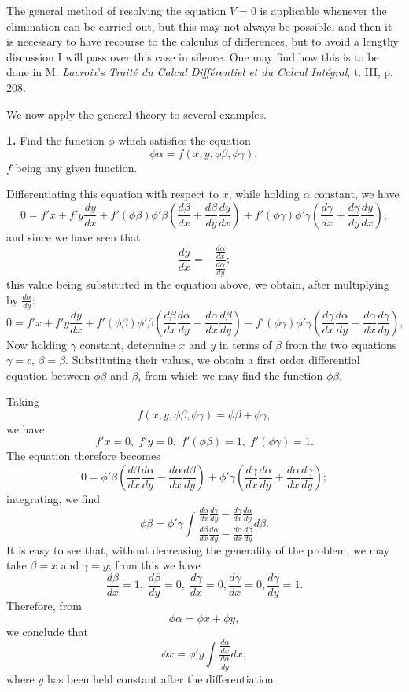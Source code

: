 \documentclass[12pt]{article}
\begin{document}
 The general method of resolving the equation $V=0$ is applicable whenever the elimination can be carried out, but this may not always be possible, and then it is necessary to have recourse to the calculus of differences, but to avoid a lengthy discussion I will pass over this case in silence.  One may find how this is to be done in M. \emph{Lacroix}'s \emph{Trait\'e du Calcul Diff\'erentiel et du Calcul Int\'egral}, t. III, p. 208. 

We now apply the general theory to several examples.

\textbf{1.} Find the function $\phi$ which satisfies the equation
\[ \phi\alpha = f(x,y,\phi\beta,\phi\gamma), \]
$f$ being any given function.

Differentiating this equation with respect to $x$, while holding $\alpha$ constant, we have
\[ 0 = f'x + f'y \frac{dy}{dx} + f'(\phi\beta) \phi'\beta \left(\frac{d\beta}{dx} + \frac{d\beta}{dy} \frac{dy}{dx}\right) + f'(\phi\gamma) \phi ' \gamma \left(\frac{d\gamma}{dx}+\frac{d \gamma}{dy}{\frac{dy}{dx}} \right), \]
and since we have seen that 
 \[ \frac{dy}{dx} = - \frac{\frac{d\alpha}{dx}}{\frac{d\alpha}{dy}} ; \]
this value being substituted in the equation above, we obtain, after multiplying by $\frac{d\alpha}{dy}$:
\[ 0 = f'x + f'y \frac{dy}{dx} + f'(\phi\beta)\phi'\beta\left(\frac{d\beta}{dx} \frac{d\alpha}{dy} - \frac{d\alpha}{dx} \frac{d\beta}{dy} \right) + f'(\phi\gamma) \phi ' \gamma \left(\frac{d\gamma}{dx}\frac{d\alpha}{dy}-\frac{d\alpha}{dx} \frac{d \gamma}{dy}\right), \]
Now holding $\gamma$ constant, determine $x$ and $y$ in terms of $\beta$ from the two equations $\gamma = c$, $\beta = \beta$.  Substituting their values, we obtain a first order differential equation between $\phi \beta$ and $\beta$, from which we may find the function $\phi \beta$.

Taking 
\[ f(x,y,\phi\beta,\phi\gamma) = \phi\beta + \phi \gamma, \]
we have 
\[ f'x = 0, \; f'y = 0, \; f'(\phi\beta) = 1, \;f'(\phi\gamma) = 1. \]
The equation therefore becomes
\[ 0 = \phi'\beta\left(\frac{d\beta}{dx} \frac{d\alpha}{dy} - \frac{d\alpha}{dx} \frac{d\beta}{dy} \right) + \phi ' \gamma \left(\frac{d\gamma}{dx}\frac{d\alpha}{dy}+\frac{d\alpha}{dx} \frac{d \gamma}{dy}\right); \]
integrating, we find
\[ \phi \beta = \phi' \gamma \int \frac{\frac{d\alpha}{dx} \frac{d \gamma}{dy} - \frac{d\gamma}{dx}\frac{d\alpha}{dy}}{ \frac{d\beta}{dx} \frac{d\alpha}{dy} - \frac{d\alpha}{dx} \frac{d\beta}{dy} } d\beta .\]
It is easy to see that, without decreasing the generality of the problem, we may take $\beta = x$ and $\gamma = y$; from this we have
\[ \frac{d\beta}{dx} = 1, \; \frac{d\beta}{dy} = 0, \; \frac{d\gamma}{dx} = 0, \frac{d\gamma}{dx} = 0, \frac{d\gamma}{dy} = 1. \]
Therefore, from
\[ \phi \alpha = \phi x + \phi y , \]
we conclude that 
\[ \phi x = \phi' y \int \frac{ \frac{d\alpha}{dx} }{ \frac{d\alpha}{dy} } dx ,\]
where $y$ has been held constant after the differentiation.  
\end{document}
